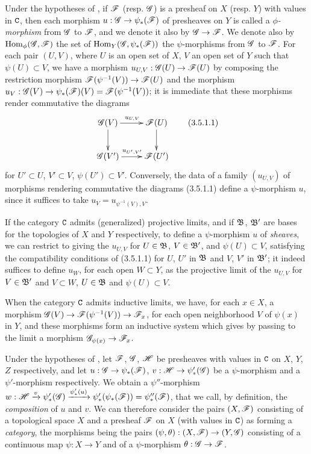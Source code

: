 \begin{env}[3.5.1]
\label{0.3.5.1}
Under the hypotheses of , if $\mathscr{F}$ (resp. $\mathscr{G}$) is a
presheaf on $X$ (resp. $Y$) with values in $\mathtt{C}$, then each morphism
$u:\sh{G}\to\psi_*(\sh{F})$ of presheaves on $Y$ is called a
\emph{$\phi$-morphism} from $\mathscr{G}$ to $\mathscr{F}$, and we denote it also by
$\sh{G}\to\sh{F}$. We denote also by ${\mathop{\mathrm{Hom}}\nolimits}_\phi(\mathscr{G},\mathscr{F})$ the set of
${\mathop{\mathrm{Hom}}\nolimits}_Y(\mathscr{G},\psi_*(\mathscr{F}))$ the $\psi$-morphisms from $\mathscr{G}$ to $\mathscr{F}$.
For each pair $(U,V)$, where $U$ is an open set of $X$, $V$ an open set of $Y$
such that $\psi(U)\subset V$, we have a morphism $u_{U,V}:\sh{G}(U)\to\sh{F}(U)$
by composing the restriction morphism $\sh{F}(\psi^{-1}(V))\to\sh{F}(U)$ and the
morphism $u_V:\sh{G}(V)\to\psi_*(\sh{F})(V)=\sh{F}(\psi^{-1}(V))$; it is
immediate that these morphisms render commutative the diagrams
\[
  \xymatrix{
    \sh{G}(V)\ar[r]^{u_{U,V}}\ar[d] &
    \sh{F}(U)\ar[d]\\
    \sh{G}(V')\ar[r]^{u_{U',V'}} &
    \sh{F}(U')
  }
  \tag{3.5.1.1}
\]
for $U'\subset U$, $V'\subset V$, $\psi(U')\subset V'$. Conversely, the data of
a family $(u_{U,V})$ of morphisms rendering commutative the diagrams (3.5.1.1)
define a $\psi$-morphism $u$, since it suffices to take
$u_V=u_{\psi^{-1}(V),V}$.

If the category $\mathtt{C}$ admits (generalized) projective limits, and if
$\mathfrak{B}$, $\mathfrak{B}'$ are bases for the topologies of $X$ and $Y$
respectively, to define a $\psi$-morphism $u$ of \emph{sheaves}, we can restrict
to giving the $u_{U,V}$ for $U\in\mathfrak{B}$, $V\in\mathfrak{B}'$, and
$\psi(U)\subset V$, satisfying the compatibility conditions of (3.5.1.1) for
$U$, $U'$ in $\mathfrak{B}$ and $V$, $V'$ in $\mathfrak{B}'$; it indeed suffices
to define $u_W$, for each open $W\subset Y$, as the projective limit of the
$u_{U,V}$ for $V\in\mathfrak{B}'$ and $V\subset W$, $U\in\mathfrak{B}$ and
$\psi(U)\subset V$.

When the category $\mathtt{C}$ admits inductive limits, we have, for each $x\in X$, a
morphism $\sh{G}(V)\to\sh{F}(\psi^{-1}(V))\to\sh{F}_x$, for each open
neighborhood $V$ of $\psi(x)$ in $Y$, and these morphisms form an inductive
system which gives by passing to the limit a morphism
$\sh{G}_{\psi(x)}\to\sh{F}_x$.
\end{env}

\begin{env}[3.5.2]
\label{0.3.5.2}
Under the hypotheses of , let $\mathscr{F}$, $\mathscr{G}$, $\mathscr{H}$ be
presheaves with values in $\mathtt{C}$ on $X$, $Y$, $Z$ respectively, and let
$u:\sh{G}\to\psi_*(\sh{F})$, $v:\sh{H}\to\psi_*'(\sh{G})$ be a $\psi$-morphism
and a $\psi'$-morphism respectively. We obtain a $\psi''$-morphism
$w:\mathscr{H}\xrightarrow{v}\psi_*'(\mathscr{G})\xrightarrow{\psi_*'(u)}
  \psi_*'(\psi_*(\mathscr{F}))=\psi_*''(\mathscr{F})$, that we call, by definition, the
\emph{composition} of $u$ and $v$. We can therefore consider the pairs
$(X,\mathscr{F})$ consisting of a topological space $X$ and a presheaf $\mathscr{F}$ on
$X$ (with values in $\mathtt{C}$) as forming a \emph{category}, the morphisms being the
pairs $(\psi,\theta):(X,\sh{F})\to(Y,\sh{G})$ consisting of a continuous map
$\psi:X\to Y$ and of a $\psi$-morphism $\theta:\sh{G}\to\sh{F}$.
\end{env}

